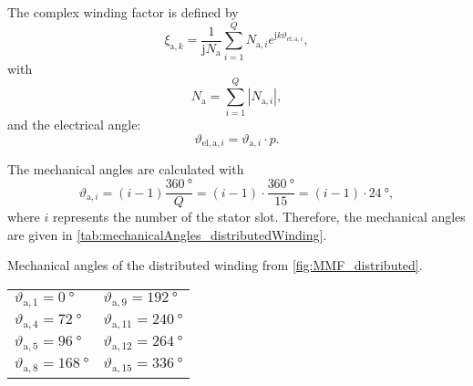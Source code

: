 \begin{solutionblock}
    The complex winding factor is defined by
    \begin{equation}
        \xi_{\mathrm{a,}k} = \frac{1}{\mathrm{j}N_{\mathrm{a}}} \sum_{i=1}^{Q} N_{\mathrm{a,}i}e^{\mathrm{j}k\vartheta_{\mathrm{el,a,}i}},
        \label{eq:complexWindingFactor}
    \end{equation}
    with
    \begin{equation}
        N_{\mathrm{a}} = \sum_{i=1}^{Q} |N_{\mathrm{a,}i} |,
    \end{equation}
    and the electrical angle:
    \begin{equation}
        \vartheta_{\mathrm{el,a,}i} = \vartheta_{\mathrm{a,}i} \cdot p.
    \end{equation}

    The mechanical angles are calculated with
    \begin{equation}
        \vartheta_{\mathrm{a,}i} = \left(i-1 \right) \frac{\SI{360}{\degree}}{Q}
        = \left(i-1 \right) \cdot \frac{\SI{360}{\degree}}{15}
        = \left(i-1 \right) \cdot \SI{24}{\degree},
    \end{equation}
    where $i$ represents the number of the stator slot.
    Therefore, the mechanical angles are given in \autoref{tab:mechanicalAngles_distributedWinding}.
    \begin{solutiontable}[ht]
        \caption{Mechanical angles of the distributed winding from \autoref{fig:MMF_distributed}.}
        \centering
        \begin{tabular}{C{3cm}|C{3cm}}\toprule
            $\vartheta_{\mathrm{a,}1} = \SI{0}{\degree}$   & $\vartheta_{\mathrm{a,}9} = \SI{192}{\degree}$  \\
            $\vartheta_{\mathrm{a,}4} = \SI{72}{\degree}$  & $\vartheta_{\mathrm{a,}11} = \SI{240}{\degree}$ \\
            $\vartheta_{\mathrm{a,}5} = \SI{96}{\degree}$  & $\vartheta_{\mathrm{a,}12} = \SI{264}{\degree}$ \\
            $\vartheta_{\mathrm{a,}8} = \SI{168}{\degree}$ & $\vartheta_{\mathrm{a,}15} = \SI{336}{\degree}$ \\
            \bottomrule
        \end{tabular}
        \label{tab:mechanicalAngles_distributedWinding}
    \end{solutiontable}


\end{solutionblock}

